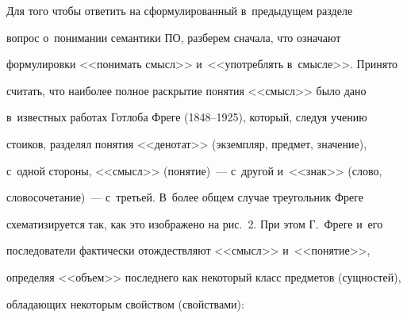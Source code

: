 

  


  Для того чтобы ответить на сформулированный в~предыдущем разделе 


вопрос о~понимании семантики ПО, разберем сначала, что означают 


формулировки <<понимать смысл>> и~<<употреблять в~смысле>>. Принято 


считать, что наиболее полное раскрытие понятия <<смысл>> было дано 


в~известных работах Готлоба Фреге (1848--1925), который, следуя учению 


стоиков, разделял понятия <<денотат>> (экземпляр, предмет, значение), 


с~одной стороны, <<смысл>> (понятие)~--- с~другой и~<<знак>> (слово, 


словосочетание)~--- с~третьей. В~более общем случае треугольник Фреге 


схематизируется так, как это изображено на рис.~2. При этом Г.~Фреге и~его 


последователи фактически отождествляют <<смысл>> и~<<понятие>>, 


определяя <<объем>> последнего как некоторый класс предметов (сущностей), 


обладающих некоторым свойством (свойствами): 


